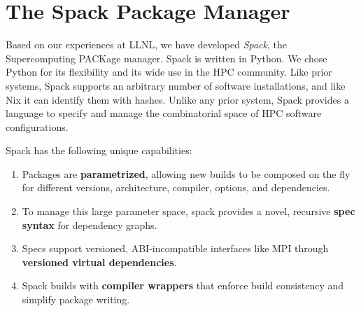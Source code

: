 
\section{The Spack Package Manager}
\label{sec:implementation}
Based on our experiences at LLNL, we have developed
{\it Spack}, the Supercomputing PACKage manager.
Spack is written in Python.  We chose Python for its flexibility
and its wide use in the HPC community.
%
Like prior systems, Spack supports an arbitrary number of software
installations, and like Nix it can identify them with hashes.  Unlike any
prior system, Spack provides a language to specify and manage the
combinatorial space of HPC software configurations.

\noindent
Spack has the following unique capabilities:
\begin{enumerate}
\item Packages are {\bf parametrized}, allowing new builds to be composed
      on the fly for different versions, architecture, compiler, options, 
      and dependencies.
\item To manage this large parameter space, spack provides a novel, 
      recursive {\bf spec syntax} for dependency graphs.
\item Specs support versioned, ABI-incompatible interfaces like MPI through
      {\bf versioned virtual dependencies}.
\item Spack builds with {\bf compiler wrappers} that enforce build
      consistency and simplify package writing.
\end{enumerate}










